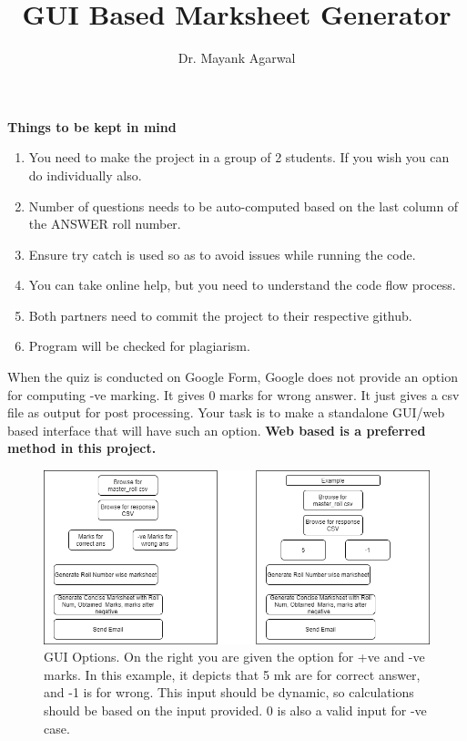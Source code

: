 \documentclass{article}
\title{GUI Based Marksheet Generator}
\author{Dr. Mayank Agarwal}
\begin{document}
	\maketitle  
	\textbf{Things to be kept in mind} 
	\begin{enumerate}
\item You need to make the project in a group of 2 students. If you wish you 
can do individually also. 
\item Number of questions needs to be auto-computed based on the last 
column of the ANSWER roll number. 	

\item Ensure try catch is used so as to avoid issues while running the code. 

\item You can take online help, but you need to understand the code flow 
process.

\item Both partners need to commit the project to their respective github. 
\item Program will be checked for plagiarism.   
\end{enumerate}

When the quiz is conducted on Google Form, Google does not provide an option 
for computing -ve marking. It gives 0 marks for wrong answer. It just gives a 
csv file as output for post 
processing. Your task is to make a standalone GUI/web based interface that will 
have such an option. \textbf{Web based is a preferred method in this project. }

\begin{figure}
	\centering
	\includegraphics[width=0.99\linewidth]{Python_Project.png}
	\caption{GUI Options. On the right you are given the option for +ve and -ve 
	marks. In this example, it depicts that 5 mk are for correct answer, and -1 
	is for wrong. This input  should be dynamic, so calculations should be 
	based on the input provided. 0 is also a valid input for -ve case.}
	\label{fig:marksheet_project}
\end{figure}
\end{document}
